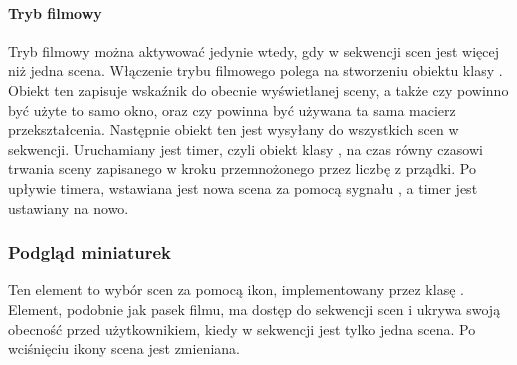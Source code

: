 \paragraph*{Tryb filmowy}

\par
Tryb filmowy można aktywować jedynie wtedy, gdy w sekwencji scen jest więcej niż jedna scena.
Włączenie trybu filmowego polega na stworzeniu obiektu klasy .
Obiekt ten zapisuje wskaźnik do obecnie wyświetlanej sceny, a także czy powinno być użyte to samo okno, oraz czy powinna być używana ta sama macierz przekształcenia.
Następnie obiekt ten jest wysyłany do wszystkich scen w sekwencji.
Uruchamiany jest timer, czyli obiekt klasy , na czas równy czasowi trwania sceny zapisanego w kroku przemnożonego przez liczbę z prządki.
Po upływie timera, wstawiana jest nowa scena za pomocą sygnału , a timer jest ustawiany na nowo.

\subsubsection{Podgląd miniaturek}
\label{sec:sokar-framechooser}

Ten element to wybór scen za pomocą ikon, implementowany przez klasę .
Element, podobnie jak pasek filmu, ma dostęp do sekwencji scen i ukrywa swoją obecność przed użytkownikiem, kiedy w sekwencji jest tylko jedna scena.
Po wciśnięciu ikony scena jest zmieniana.